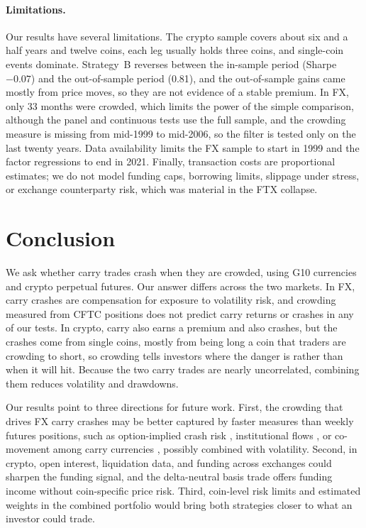 \documentclass[11pt]{article}
\begin{document}
\paragraph{Limitations.}
Our results have several limitations. The crypto sample covers about six and a half years and twelve coins, each leg usually holds three coins, and single-coin events dominate. Strategy~B reverses between the in-sample period (Sharpe $-0.07$) and the out-of-sample period (0.81), and the out-of-sample gains came mostly from price moves, so they are not evidence of a stable premium. In FX, only 33 months were crowded, which limits the power of the simple comparison, although the panel and continuous tests use the full sample, and the crowding measure is missing from mid-1999 to mid-2006, so the filter is tested only on the last twenty years. Data availability limits the FX sample to start in 1999 and the factor regressions to end in 2021. Finally, transaction costs are proportional estimates; we do not model funding caps, borrowing limits, slippage under stress, or exchange counterparty risk, which was material in the FTX collapse.

\section{Conclusion}\label{sec:concl}

We ask whether carry trades crash when they are crowded, using G10 currencies and crypto perpetual futures. Our answer differs across the two markets. In FX, carry crashes are compensation for exposure to volatility risk, and crowding measured from CFTC positions does not predict carry returns or crashes in any of our tests. In crypto, carry also earns a premium and also crashes, but the crashes come from single coins, mostly from being long a coin that traders are crowding to short, so crowding tells investors where the danger is rather than when it will hit. Because the two carry trades are nearly uncorrelated, combining them reduces volatility and drawdowns.

Our results point to three directions for future work. First, the crowding that drives FX carry crashes may be better captured by faster measures than weekly futures positions, such as option-implied crash risk \citep{Kutuk2025}, institutional flows \citep{CheemaFox2025}, or co-movement among carry currencies \citep{Sokolovski2016}, possibly combined with volatility. Second, in crypto, open interest, liquidation data, and funding across exchanges could sharpen the funding signal, and the delta-neutral basis trade \citep{Christin2023, Gornall2025} offers funding income without coin-specific price risk. Third, coin-level risk limits and estimated weights in the combined portfolio would bring both strategies closer to what an investor could trade.
\end{document}
